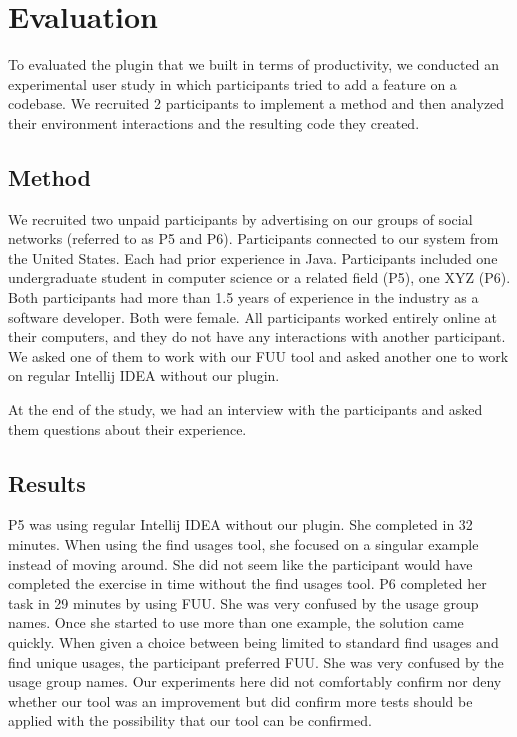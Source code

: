 \documentclass[conference]{IEEEtran}
\begin{document}
\section{Evaluation}
To evaluated the plugin that we built in terms of productivity, we conducted an experimental user study in which participants tried to add a feature on a codebase. We recruited 2 participants to implement a method and then analyzed their environment interactions and the resulting code they created. 
\subsection{Method}
We recruited two unpaid participants by advertising on our groups of social networks (referred to as P5 and P6). Participants connected to our system from the United States. Each had prior experience in Java. Participants included one undergraduate student in computer science or a related field (P5),  one  XYZ  (P6). Both participants had more than 1.5 years of experience in the industry as a software developer. Both were female. All participants worked entirely online at their computers, and they do not have any interactions with another participant. We asked one of them to work with our FUU tool and asked another one to work on regular Intellij IDEA without our plugin. 

At the end of the study, we had an interview with the participants and asked them questions about their experience.
\subsection{Results}
P5 was using regular Intellij IDEA without our plugin. She completed in 32 minutes. When using the find usages tool, she focused on a singular example instead of moving around. She did not seem like the participant would have completed the exercise in time without the find usages tool.
P6 completed her task in 29 minutes by using FUU. She was very confused by the usage group names. Once she started to use more than one example, the solution came quickly. When given a choice between being limited to standard find usages and find unique usages, the participant preferred FUU. She was very confused by the usage group names.
Our experiments here did not comfortably confirm nor deny whether our tool was an improvement but did confirm more tests should be applied with the possibility that our tool can be confirmed.
\end{document}
